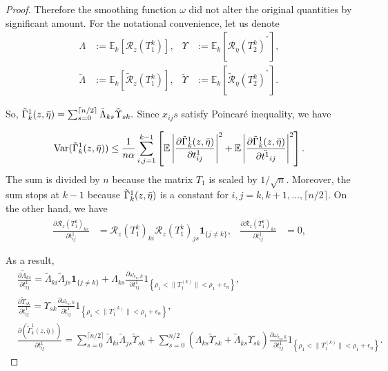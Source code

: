 \documentclass[12pt]{amsart}
\theoremstyle{plain}
\theoremstyle{definition}
\newcommand{\conjugate}{{\operatorname{^*}}}
\newcommand{\Var}{\operatorname{Var}}
\begin{document}
\begin{proof}
Therefore the smoothing function $\omega$ did not alter the original quantities by significant amount. For the notational convenience, let us denote
\begin{align*}
    \Lambda &:= \mathbb{E}_k[\mathcal{R}_{z}(T_1^k)], & \Upsilon &:= \mathbb{E}_k[\mathcal{R}_{\eta}(T_2^k)^\conjugate],\\
    \tilde{\Lambda} &:= \mathbb{E}_k[\tilde{\mathcal{R}}_z(T_1^k)], &\tilde{\Upsilon} &:= \mathbb{E}_k[\tilde{\mathcal{R}}_\eta(T_2^k)^\conjugate].
\end{align*}

So, $\tilde{\Gamma}_{k}^1(z,\bar{\eta}) = \sum_{s=0}^{\lceil n/2 \rceil} \Tilde{\Lambda}_{ks}\Tilde{\Upsilon}_{sk}.$ Since $x_{ij}s$ satisfy Poincar\'e inequality, we have

\begin{align}
    \Var(\Tilde\Gamma_{k}^1(z,\bar{\eta})) \leq \frac{1}{n\alpha} \sum_{i,j=1}^{k-1}\left[\mathbb{E}\left|\frac{\partial \Tilde\Gamma_{k}^1(z,\bar{\eta})}{\partial t^{1}_{ij}}\right|^2 +\mathbb{E}\left|\frac{\partial \Tilde\Gamma_{k}^1(z,\bar{\eta})}{\partial \bar{t^{1}}_{ij}}\right|^2\right].\label{eqn: variance bound by poincare inequality}
\end{align}
The sum is divided by $n$ because the matrix $T_{1}$ is scaled by $1/\sqrt{n}$. Moreover, the sum stops at $k-1$ because $\Tilde\Gamma_{k}^1(z,\bar{\eta})$ is a constant for $i, j = k,k+1,\dots, \lceil n/2 \rceil$. On the other hand, we have
\begin{align*}
    \frac{\partial \mathcal{R}_{z}(T_1^k)_{ks}}{\partial t_{ij}^1} &= \mathcal{R}_{z}(T_1^k)_{ki} \mathcal{R}_{z}(T_1^k)_{js}\mathbf{1}_{\{j\neq k\}},& 
    \frac{\partial \overline{\mathcal{R}_{z}(T_1^k)_{ks}}}{\partial t_{ij}^1}&=0, 
\end{align*}

As a result,
\begin{align*}
    &\frac{\partial \tilde{\Lambda}_{k s}}{\partial t^{1}_{i j}}=\tilde{\Lambda}_{k i} \tilde{\Lambda}_{j s}\mathbf{1}_{\{j\neq k\}}+\Lambda_{k s} \frac{\partial \omega_{\epsilon_n, k}}{\partial t^{1}_{i j}} 1_{\left\{\rho_1<\|T_{1}^{(k)}\|<\rho_1+\epsilon_n\right\}}, \\
    &\frac{\partial \tilde{\Upsilon}_{s k}}{\partial t^{1}_{i j}}=\Upsilon_{s k} \frac{\partial \omega_{\epsilon_n, k}}{\partial t^{1}_{i j}} 1_{\left\{\rho_1<\|T_{1}^{(k)}\|<\rho_1+\epsilon_n\right\}}, \\
    &\frac{\partial\left(\tilde{\Gamma}_{k}^1(z, \bar{\eta})\right)}{\partial t^{1}_{i j}}=  \sum_{s=0} ^{\lceil n/2 \rceil} \tilde{\Lambda}_{k i} \tilde{\Lambda}_{j s} \tilde{\Upsilon}_{s k}+\sum_{s=0} ^{n/2}\left(\Lambda_{k s } \tilde\Upsilon_{s k}+\tilde{\Lambda}_{k s} \Upsilon_{s k}\right) \frac{\partial \omega_{\epsilon_n, k}}{\partial t^{1}_{i j}} 1_{\left\{\rho_1<\|T_{1}^{(k)}\|<\rho_1+\epsilon_n\right\}}.
\end{align*}


\end{proof}
\end{document}
